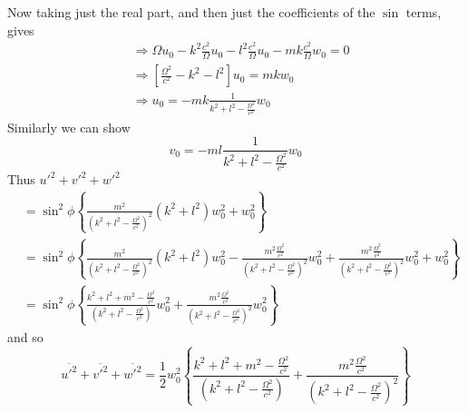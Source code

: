 \documentclass[12pt]{article}
\begin{document}
Now taking just the real part, and then just the coefficients of the $\sin$ terms, gives
\begin{align}
& \Rightarrow \Omega u_0 - k^2 \frac{c^2}{\Omega} u_0 - l^2 \frac{c^2}{\Omega} u_0 - mk\frac{c^2}{\Omega} w_0 = 0 \\ 
& \Rightarrow \left[\frac{\Omega ^2}{c^2} - k^2 - l^2 \right] u_0 = mkw_0 \\ 
& \Rightarrow u_0 = -mk \frac{1}{k^2 + l^2 - \frac{ \Omega ^2}{c^2} } w_0 
\label{Eq:u_0}
\end{align}
Similarly we can show 
\begin{equation}
v_0 = -ml \frac{1}{k^2 + l^2 - \frac{ \Omega ^2}{c^2} } w_0 
\end{equation}
Thus $u'^2 + v'^2 + w'^2$
\begin{align}
&  = \sin^2\phi \left\{ \frac{m^2}{\left(k^2 + l^2 -\frac{\Omega ^2}{c^2}\right)^2} \left(k^2 + l^2\right)w_0^2 + w_0^2 \right\}  \\
&  = \sin^2\phi \left\{ \frac{m^2}{\left(k^2 + l^2 -\frac{\Omega^2}{c^2}\right)^2} \left(k^2 + l^2\right)w_0^2  - \frac{m^2 \frac{\Omega^2}{c^2}}{\left(k^2 + l^2 -\frac{\Omega^2}{c^2}\right)^2}w_0^2 + \frac{m^2 \frac{\Omega^2}{c^2}}{\left(k^2 + l^2 -\frac{\Omega^2}{c^2}\right)^2}w_0^2 + w_0^2 \right\} \\
&  = \sin^2\phi \left\{ \frac{k^2 + l^2  + m^2 -\frac{\Omega^2}{c^2}}{\left(k^2 + l^2 -\frac{\Omega^2}{c^2}\right)} w_0^2 + \frac{m^2 \frac{\Omega^2}{c^2}}{\left(k^2 + l^2 -\frac{\Omega^2}{c^2}\right)^2}w_0^2 \right\}
\end{align}
and so 
\begin{equation}
\overline{u'^2} + \overline{v'^2} + \overline{w'^2} = \frac{1}{2} w_0^2 \left\{ \frac{k^2 + l^2  + m^2 -\frac{\Omega^2}{c^2}}{\left(k^2 + l^2 -\frac{\Omega^2}{c^2}\right)} + \frac{m^2 \frac{\Omega^2}{c^2}}{\left(k^2 + l^2 -\frac{\Omega^2}{c^2}\right)^2} \right\}
\end{equation}
\end{document}
